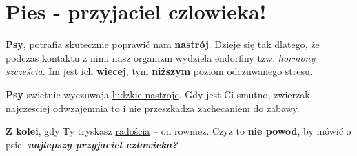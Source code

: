 \setlength{\parindent}{20pt}
\section*{Pies - przyjaciel czlowieka!}
\textbf{Psy}, potrafia skutecznie poprawić nam \textbf{nastrój}. Dzieje się tak dlatego, że podczas kontaktu z nimi nasz organizm wydziela endorfiny tzw. \textit{hormony szcześcia}. Im jest ich \textbf{wiecej}, tym \textbf{niższym} poziom odczuwanego stresu.

\textbf{Psy} swietnie wyczuwaja \underline{ludzkie nastroje}. Gdy jest Ci smutno, zwierzak najczesciej odwzajemnia to i nie przeszkadza zachecaniem do zabawy.  

\textbf{Z kolei}, gdy Ty tryskasz \underline{radościa} – on rowniez. Czyz to \textbf{nie powod}, by mówić o psie: \textbf{\textit{najlepszy przyjaciel człowieka?}}